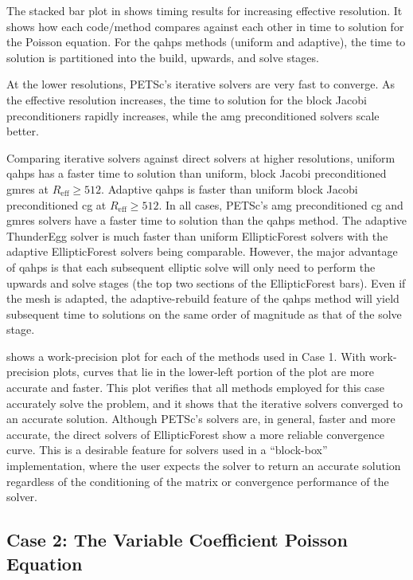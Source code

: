 The stacked bar plot in  shows timing results for increasing effective resolution. It shows how each code/method compares against each other in time to solution for the Poisson equation. For the \gls{qahps} methods (uniform and adaptive), the time to solution is partitioned into the build, upwards, and solve stages.

At the lower resolutions, PETSc's iterative solvers are very fast to converge. As the effective resolution increases, the time to solution for the block Jacobi preconditioners rapidly increases, while the \gls{amg} preconditioned solvers scale better.

Comparing iterative solvers against direct solvers at higher resolutions, uniform \gls{qahps} has a faster time to solution than uniform, block Jacobi preconditioned \gls{gmres} at $R_{\text{eff}} \ge 512$. Adaptive \gls{qahps} is faster than uniform block Jacobi preconditioned \gls{cg} at $R_{\text{eff}} \ge 512$. In all cases, PETSc's \gls{amg} preconditioned \gls{cg} and \gls{gmres} solvers have a faster time to solution than the \gls{qahps} method. The adaptive ThunderEgg solver is much faster than uniform EllipticForest solvers with the adaptive EllipticForest solvers being comparable. However, the major advantage of \gls{qahps} is that each subsequent elliptic solve will only need to perform the upwards and solve stages (the top two sections of the EllipticForest bars). Even if the mesh is adapted, the adaptive-rebuild feature of the \gls{qahps} method will yield subsequent time to solutions on the same order of magnitude as that of the solve stage.

 shows a work-precision plot for each of the methods used in Case 1. With work-precision plots, curves that lie in the lower-left portion of the plot are more accurate and faster. This plot verifies that all methods employed for this case accurately solve the problem, and it shows that the iterative solvers converged to an accurate solution. Although PETSc's solvers are, in general, faster and more accurate, the direct solvers of EllipticForest show a more reliable convergence curve. This is a desirable feature for solvers used in a ``block-box'' implementation, where the user expects the solver to return an accurate solution regardless of the conditioning of the matrix or convergence performance of the solver.

\subsection{Case 2: The Variable Coefficient Poisson Equation}
\label{sub:case2}

